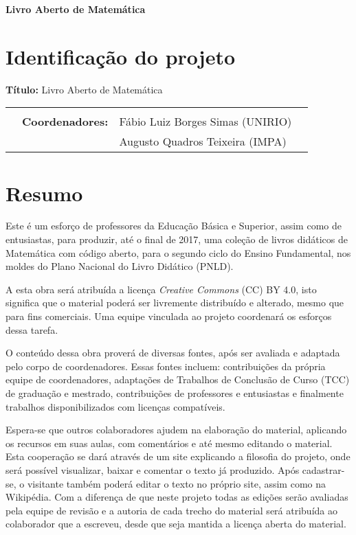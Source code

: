 \documentclass[10 pt]{article}
\begin{document}

\begin{center}
{\large{\bf   Livro Aberto de Matemática}}
 \end{center}


    \section{Identificação do projeto}
\textbf{T\'itulo:} Livro Aberto de Matemática

\begin{flushright}
  \noindent
  \begin{tabular}{llll}
    &&\\
    &\textbf{Coordenadores:}& Fábio Luiz Borges Simas (UNIRIO)\\
    & & Augusto Quadros Teixeira (IMPA)

  \end{tabular}

\end{flushright}
\vspace{0.3cm}

\section{Resumo}

Este é um esforço de professores da Educação Básica e Superior, assim como de entusiastas, para produzir, até o final de 2017, uma coleção de livros didáticos de Matemática com código aberto, para o segundo ciclo do Ensino Fundamental, nos moldes do Plano Nacional do Livro Didático (PNLD).

A esta obra será atribuída a licença {\it Creative Commons} (CC) BY 4.0, isto significa que o material poderá ser livremente distribuído e alterado, mesmo que para fins comerciais.
Uma equipe vinculada ao projeto coordenará os esforços dessa tarefa.

O conteúdo dessa obra proverá de diversas fontes, após ser avaliada e adaptada pelo corpo de coordenadores.
Essas fontes incluem: contribuições da própria equipe de coordenadores, adaptações de Trabalhos de Conclusão de Curso (TCC) de graduação e mestrado, contribuições de professores e entusiastas e finalmente trabalhos disponibilizados com licenças compatíveis.

Espera-se que outros colaboradores ajudem na elaboração do material, aplicando os recursos em suas aulas, com comentários e até mesmo editando o material.
Esta cooperação se dará através de um site explicando a filosofia do projeto, onde será possível visualizar, baixar e comentar o texto já produzido.
Após cadastrar-se, o visitante também poderá editar o texto no próprio site, assim como na Wikipédia.
Com a diferença de que neste projeto todas as edições serão avaliadas pela equipe de revisão e a autoria de cada trecho do material será atribuída ao colaborador que a escreveu, desde que seja mantida a licença aberta do material.
\end{document}
